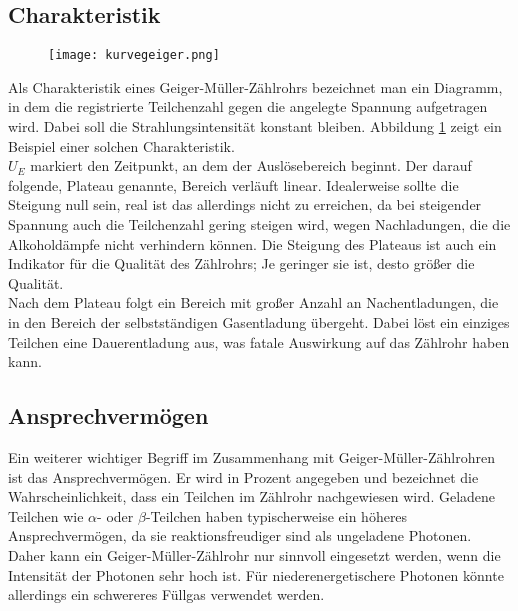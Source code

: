 \subsection{Charakteristik}
\begin{figure}
 \centering
 \texttt{[image: kurvegeiger.png]}
 \label{fig:char}
\end{figure}

Als Charakteristik eines Geiger-Müller-Zählrohrs bezeichnet man ein Diagramm,
in dem die registrierte Teilchenzahl gegen die angelegte Spannung aufgetragen wird.
Dabei soll die Strahlungsintensität konstant bleiben. Abbildung \ref{fig:char} zeigt 
ein Beispiel einer solchen Charakteristik.\\
$U_E$ markiert den Zeitpunkt, an dem der Auslösebereich beginnt. Der darauf
folgende, Plateau genannte, Bereich verläuft linear. Idealerweise sollte die 
Steigung null sein, real ist das allerdings nicht zu erreichen, da bei steigender
Spannung auch die Teilchenzahl gering steigen wird, wegen Nachladungen, die
die Alkoholdämpfe nicht verhindern können. Die Steigung des Plateaus ist auch ein
Indikator für die Qualität des Zählrohrs; Je geringer sie ist, desto größer
die Qualität.\\
Nach dem Plateau folgt ein Bereich mit großer Anzahl an Nachentladungen, die in den
Bereich der selbstständigen Gasentladung übergeht. Dabei löst ein einziges Teilchen 
eine Dauerentladung aus, was fatale Auswirkung auf das Zählrohr haben kann.\\

\subsection{Ansprechvermögen}
Ein weiterer wichtiger Begriff im Zusammenhang mit Geiger-Müller-Zählrohren 
ist das Ansprechvermögen.
Er wird in Prozent angegeben und bezeichnet die Wahrscheinlichkeit, dass ein Teilchen im Zählrohr nachgewiesen
wird. Geladene Teilchen wie $\alpha$- oder $\beta$-Teilchen haben typischerweise ein höheres Ansprechvermögen, 
da sie reaktionsfreudiger sind als ungeladene Photonen. Daher kann ein
Geiger-Müller-Zählrohr nur sinnvoll eingesetzt werden, wenn die Intensität
der Photonen sehr hoch ist. Für niederenergetischere Photonen könnte allerdings
ein schwereres Füllgas verwendet werden.

